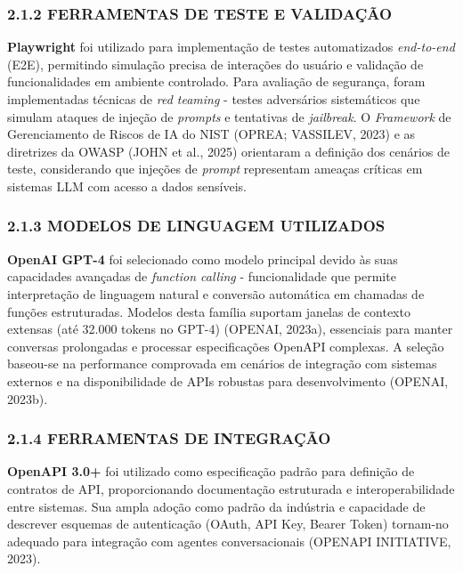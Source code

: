 \documentclass[
]{article}
\begin{document}
\subsubsection{2.1.2 FERRAMENTAS DE TESTE E
VALIDAÇÃO}\label{ferramentas-de-teste-e-validauxe7uxe3o}

\textbf{Playwright} foi utilizado para implementação de testes
automatizados \emph{end-to-end} (E2E), permitindo simulação precisa de
interações do usuário e validação de funcionalidades em ambiente
controlado. Para avaliação de segurança, foram implementadas técnicas de
\emph{red teaming} - testes adversários sistemáticos que simulam ataques
de injeção de \emph{prompts} e tentativas de \emph{jailbreak}. O
\emph{Framework} de Gerenciamento de Riscos de IA do NIST (OPREA;
VASSILEV, 2023) e as diretrizes da OWASP (JOHN et al., 2025) orientaram
a definição dos cenários de teste, considerando que injeções de
\emph{prompt} representam ameaças críticas em sistemas LLM com acesso a
dados sensíveis.

\subsubsection{2.1.3 MODELOS DE LINGUAGEM
UTILIZADOS}\label{modelos-de-linguagem-utilizados}

\textbf{OpenAI GPT-4} foi selecionado como modelo principal devido às
suas capacidades avançadas de \emph{function calling} - funcionalidade
que permite interpretação de linguagem natural e conversão automática em
chamadas de funções estruturadas. Modelos desta família suportam janelas
de contexto extensas (até 32.000 tokens no GPT-4) (OPENAI, 2023a),
essenciais para manter conversas prolongadas e processar especificações
OpenAPI complexas. A seleção baseou-se na performance comprovada em
cenários de integração com sistemas externos e na disponibilidade de
APIs robustas para desenvolvimento (OPENAI, 2023b).

\subsubsection{2.1.4 FERRAMENTAS DE
INTEGRAÇÃO}\label{ferramentas-de-integrauxe7uxe3o}

\textbf{OpenAPI 3.0+} foi utilizado como especificação padrão para
definição de contratos de API, proporcionando documentação estruturada e
interoperabilidade entre sistemas. Sua ampla adoção como padrão da
indústria e capacidade de descrever esquemas de autenticação (OAuth, API
Key, Bearer Token) tornam-no adequado para integração com agentes
conversacionais (OPENAPI INITIATIVE, 2023).
\end{document}
